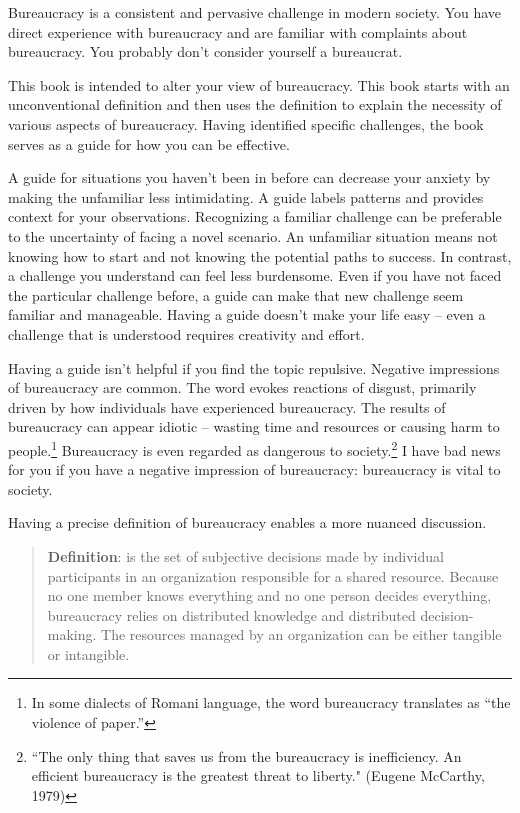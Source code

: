 

Bureaucracy is a consistent and pervasive challenge in modern society. You have direct experience with bureaucracy and are familiar with complaints about bureaucracy. You probably don't consider yourself a bureaucrat.

This book is intended to alter your view of bureaucracy. This book starts with an unconventional definition and then uses the definition to explain the necessity of various aspects of bureaucracy. Having identified specific challenges, the book serves as a guide for how you can be effective. 

A guide for situations you haven't been in before can decrease your anxiety by making the unfamiliar less intimidating. 
A guide labels patterns and provides context for your observations. 
Recognizing a familiar challenge can be preferable to the uncertainty of facing a novel scenario. An unfamiliar situation means not knowing how to start and not knowing the potential paths to success. In contrast, a challenge you understand can feel less burdensome. 
Even if you have not faced the particular challenge before, a guide can make that new challenge seem familiar and manageable. 
Having a guide doesn't make your life easy -- even a challenge that is understood requires creativity and effort.


Having a guide isn't helpful if you find the topic repulsive.
Negative impressions of bureaucracy are common. The word
evokes reactions of disgust, primarily driven by how individuals have experienced bureaucracy.
The results of bureaucracy can appear idiotic -- 
wasting time and resources or causing harm to people.\footnote{In some dialects of Romani language, the word bureaucracy translates as ``the violence of paper.''}
Bureaucracy is even regarded as dangerous to society.\footnote{``The only thing that saves us from the bureaucracy is inefficiency. An efficient bureaucracy is the greatest threat to liberty." (Eugene McCarthy, 1979)}
I have bad news for you if you have a negative impression of bureaucracy: bureaucracy is vital to society. 

Having a precise definition of bureaucracy enables a more nuanced discussion.\nolinebreak 
\begin{quote}
\textbf{Definition}: 
\iftoggle{glossarysubstitutionworks}{\Gls{bureaucracy}}{Bureaucracy}
is the set of subjective decisions made by individual participants in an organization responsible for a shared resource. Because no one member knows everything and no one person decides everything, bureaucracy relies on distributed knowledge and distributed decision-making.
The resources managed by an organization can be either tangible or intangible.  
\end{quote}


